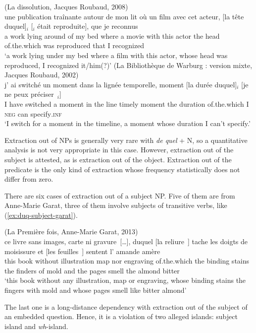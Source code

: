 \eal \label{ex:duq-noun-piedpiping}
\ex (La dissolution, Jacques Roubaud, 2008)\\
\gll une publication traînante autour de mon lit où un film avec cet acteur, [la tête duquel]$_i$ [\trace{}$_i$ était reproduite], que je reconnus\\
a work lying around of my bed where a movie with this actor the head of.the.which {} was reproduced that I recognized\\
\glt `a work lying under my bed where a film with this actor, whose head was reproduced, I recognized it/him(?)'
\label{ex:duq-noun-piedpiping-subject}
\ex (La Bibliothèque de Warburg : version mixte, Jacques Roubaud, 2002)\\
\gll j' ai switché un moment dans la lignée temporelle, moment [la durée duquel]$_i$ [je ne peux préciser~\trace{}$_i$]\\
I have switched a moment in the line timely moment the duration of.the.which I \textsc{neg} can specify\textsc{.inf}\\
\glt `I switch for a moment in the timeline, a moment whose duration I can't specify.'
\label{ex:duq-noun-piedpiping-object}
\zl 

Extraction out of NPs is generally very rare with \emph{de quel} + N, so a quantitative analysis is not very appropriate in this case. However, extraction out of the subject is attested, as is extraction out of the object. Extraction out of the predicate is the only kind of extraction whose frequency statistically does not differ from zero. 

There are six cases of extraction out of a subject NP. Five of them are from Anne-Marie Garat, three of them involve subjects of transitive verbs, like (\ref{ex:duq-subject-garat}). 

\ea (La Première fois, Anne-Marie Garat, 2013)\\
\gll ce livre sans images, carte ni gravure~[\dots], duquel [la reliure~\trace{}] tache les doigts de moisissure et [les feuilles~\trace{}] sentent l' amande amère\\
this book without illustration map nor engraving of.the.which the binding stains the finders of mold and the pages smell the almond bitter\\
\glt `this book without any illustration, map or engraving, whose binding stains the fingers with mold and whose pages smell like bitter almond'
\label{ex:duq-subject-garat}
\z 

The last one is a long-distance dependency with extraction out of the subject of an embedded question. Hence, it is a violation of two alleged islands: subject island and \textit{wh}-island. 

